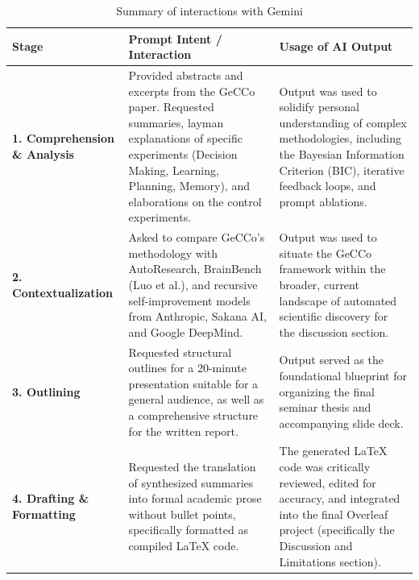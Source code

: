 \begin{table}[h]
    \centering
    \renewcommand{\arraystretch}{1.5}
    \begin{tabularx}{\textwidth}{@{} >{\raggedright\arraybackslash}p{3cm} X X @{}}
        \toprule
        \textbf{Stage} & \textbf{Prompt Intent / Interaction} & \textbf{Usage of AI Output} \\
        \midrule
        \textbf{1. Comprehension \& Analysis} & Provided abstracts and excerpts from the GeCCo paper. Requested summaries, layman explanations of specific experiments (Decision Making, Learning, Planning, Memory), and elaborations on the control experiments. & Output was used to solidify personal understanding of complex methodologies, including the Bayesian Information Criterion (BIC), iterative feedback loops, and prompt ablations. \\
        \textbf{2. Contextualization} & Asked to compare GeCCo's methodology with AutoResearch, BrainBench (Luo et al.), and recursive self-improvement models from Anthropic, Sakana AI, and Google DeepMind. & Output was used to situate the GeCCo framework within the broader, current landscape of automated scientific discovery for the discussion section. \\
        \textbf{3. Outlining} & Requested structural outlines for a 20-minute presentation suitable for a general audience, as well as a comprehensive structure for the written report. & Output served as the foundational blueprint for organizing the final seminar thesis and accompanying slide deck. \\
        \textbf{4. Drafting \& Formatting} & Requested the translation of synthesized summaries into formal academic prose without bullet points, specifically formatted as compiled \LaTeX{} code. & The generated \LaTeX{} code was critically reviewed, edited for accuracy, and integrated into the final Overleaf project (specifically the Discussion and Limitations section). \\
        \bottomrule
    \end{tabularx}
    \caption{Summary of interactions with Gemini}
\end{table} 

 

